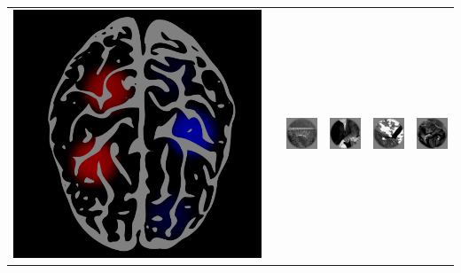 \documentclass{beamer}
\begin{document}
\begin{frame}
\begin{center}
\begin{tabular}{c|c|cccc}
\includegraphics[scale = 0.035]{brain3.png} & \hspace{0.5in}
& \includegraphics[scale = .26]{img1.png}
& \includegraphics[scale = .26]{img2.png}
& \includegraphics[scale = .26]{img3.png}
& \includegraphics[scale = .26]{img4.png}\\

\end{tabular}
\end{center}
\end{frame}
\end{document}
